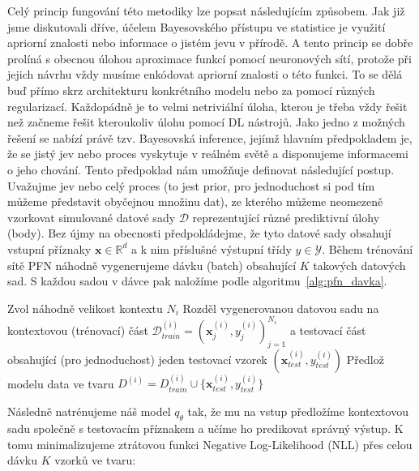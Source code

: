 Celý princip fungování této metodiky lze popsat následujícím způsobem.
Jak již jsme diskutovali dříve, účelem Bayesovského přístupu ve statistice je využití apriorní znalosti nebo informace o jistém jevu v přírodě. 
A tento princip se dobře prolíná s obecnou úlohou aproximace funkcí pomocí neuronových sítí, protože při jejich návrhu vždy musíme enkódovat apriorní znalosti o této funkci.
To se dělá buď přímo skrz architekturu konkrétního modelu nebo za pomocí různých regularizací. 
Každopádně je to velmi netriviální úloha, kterou je třeba vždy řešit než začneme řešit kteroukoliv úlohu pomocí DL nástrojů. 
Jako jedno z možných řešení se nabízí právě tzv. Bayesovská inference, jejímž hlavním předpokladem je, že se jistý jev nebo proces vyskytuje v reálném světě a disponujeme informacemi o jeho chování.
Tento předpoklad nám umožňuje definovat následující postup.    
Uvažujme jev nebo celý proces (to jest prior, pro jednoduchost si pod tím můžeme představit obyčejnou množinu dat), ze kterého můžeme neomezeně vzorkovat simulované datové sady $\mathcal{D}$ reprezentující různé prediktivní úlohy (body). 
Bez újmy na obecnosti předpokládejme, že tyto datové sady obsahují vstupní příznaky $\mathbf{x} \in \mathbb{R}^d$ a k nim příslušné výstupní třídy $y \in \mathcal{Y}$.
Během trénování sítě PFN náhodně vygenerujeme dávku (batch) obsahující $K$ takových datových sad.
S každou sadou v dávce pak naložíme podle algoritmu~\ref{alg:pfn_davka}.

\begin{algorithm}[H]
\caption{Příprava jedné trénovací dávky pro PFN}
\label{alg:pfn_davka}
\begin{algorithmic}[1]
    \State Zvol náhodně velikost kontextu $N_i$
    \State Rozděl vygenerovanou datovou sadu na kontextovou (trénovací) část $\mathcal{D}^{(i)}_{train} = (\mathbf{x}_j^{(i)}, y_j^{(i)})_{j=1}^{N_i}$ a testovací část obsahující (pro jednoduchost) jeden testovací vzorek $(\mathbf{x}^{(i)}_{test}, y^{(i)}_{test})$
    \State Předlož modelu data ve tvaru $D^{(i)} = D^{(i)}_{train} \cup \{\mathbf{x}^{(i)}_{test}, y^{(i)}_{test}\}$
\EndFor
\end{algorithmic}
\end{algorithm}

Následně natrénujeme náš model $q_\theta$ tak, že mu na vstup předložíme kontextovou sadu společně s testovacím příznakem a učíme ho predikovat správný výstup. K tomu minimalizujeme ztrátovou funkci Negative Log-Likelihood (NLL) přes celou dávku $K$ vzorků ve tvaru:

